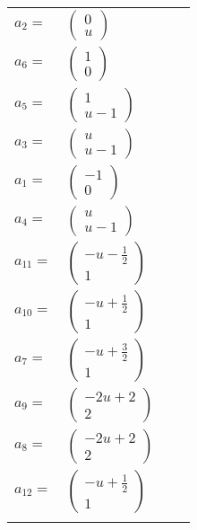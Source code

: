 \documentclass[1p]{elsarticle_modified}
\theoremstyle{definition}
\begin{document}
\begin{tabular}{m{7pt} m{180pt} m{7pt} m{180pt} }
\flushright $a_{2}=$&$\begin{pmatrix}0\\u\end{pmatrix}$ \\
\flushright $a_{6}=$&$\begin{pmatrix}1\\0\end{pmatrix}$ \\
\flushright $a_{5}=$&$\begin{pmatrix}1\\u-1\end{pmatrix}$ \\
\flushright $a_{3}=$&$\begin{pmatrix}u\\u-1\end{pmatrix}$ \\
\flushright $a_{1}=$&$\begin{pmatrix}-1\\0\end{pmatrix}$ \\
\flushright $a_{4}=$&$\begin{pmatrix}u\\u-1\end{pmatrix}$ \\
\flushright $a_{11}=$&$\begin{pmatrix}- u-\frac{1}{2}\\1\end{pmatrix}$ \\
\flushright $a_{10}=$&$\begin{pmatrix}- u+\frac{1}{2}\\1\end{pmatrix}$ \\
\flushright $a_{7}=$&$\begin{pmatrix}- u+\frac{3}{2}\\1\end{pmatrix}$ \\
\flushright $a_{9}=$&$\begin{pmatrix}-2 u+2\\2\end{pmatrix}$ \\
\flushright $a_{8}=$&$\begin{pmatrix}-2 u+2\\2\end{pmatrix}$ \\
\flushright $a_{12}=$&$\begin{pmatrix}- u+\frac{1}{2}\\1\end{pmatrix}$\\&\end{tabular}
\end{document}
